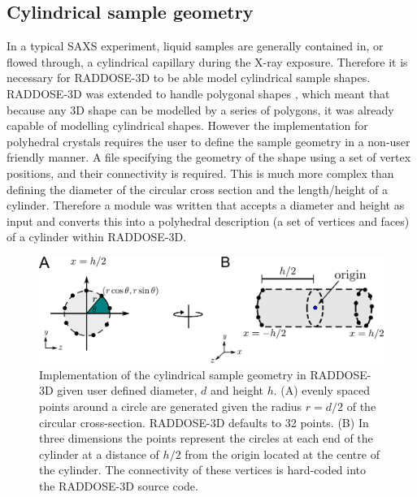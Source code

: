 \subsection{Cylindrical sample geometry}
\label{sub:Cylindrical sample geometry}
In a typical SAXS experiment, liquid samples are generally contained in, or flowed through, a cylindrical capillary during the X-ray exposure.
Therefore it is necessary for RADDOSE-3D to be able model cylindrical sample shapes.
RADDOSE-3D was extended to handle polygonal shapes \cite{bury2015radiation}, which meant that because any 3D shape can be modelled by a series of polygons, it was already capable of modelling cylindrical shapes.
However the implementation for polyhedral crystals requires the user to define the sample geometry in a non-user friendly manner.
A file specifying the geometry of the shape using a set of vertex positions, and their connectivity is required.
This is much more complex than defining the diameter of the circular cross section and the length/height of a cylinder.
Therefore a module was written that accepts a diameter and height as input and converts this into a polyhedral description (a set of vertices and faces) of a cylinder within RADDOSE-3D.
\begin{figure}
    \centering
    \includegraphics[width=1\textwidth]{figures/saxs/cylinder_implementation.pdf}
    \caption[Implementation of the cylindrical sample geometry in RADDOSE-3D.]{Implementation of the cylindrical sample geometry in RADDOSE-3D given user defined diameter, $d$ and height $h$. (A) evenly spaced points around a circle are generated given the radius $r = d/2$ of the circular cross-section. RADDOSE-3D defaults to 32 points. (B) In three dimensions the points represent the circles at each end of the cylinder at a distance of $h/2$ from the origin located at the centre of the cylinder. The connectivity of these vertices is hard-coded into the RADDOSE-3D source code.}
    \label{fig:Cylindrical implementation}
\end{figure}

